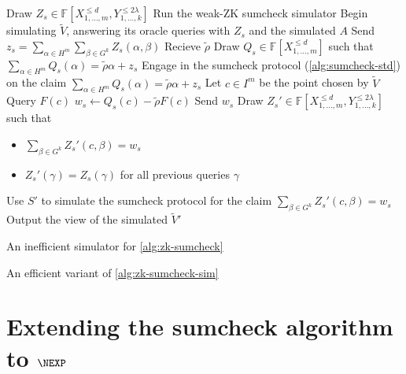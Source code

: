 \documentclass[english]{reedthesis}
\theoremstyle{plain}
\theoremstyle{definition}
\theoremstyle{remark}
\begin{document}
\begin{algorithm}[htbp]
  Draw $Z_{s} \in \mathbb{F}[X_{1, \ldots, m}^{\le d}, Y_{1, \ldots, k}^{\le 2\lambda}]$\;
  Run the weak-ZK sumcheck simulator\; %
  Begin simulating $\tilde{V}$, answering its oracle queries with $Z_{s}$ and
  the simulated $A$\;
  Send $z_{s} = \sum_{\alpha \in H^{m}}\sum_{\beta \in G^{k}}Z_{s}(\alpha, \beta)$\;
  Recieve $\tilde{\rho}$\; %
  Draw $Q_{s} \in \mathbb{F}[X_{1, \ldots, m}^{\le d}]$ such that
  $\sum_{\alpha \in H^{m}}Q_{s}(\alpha) = \tilde{\rho}\alpha + z_{s}$\;
  Engage in the sumcheck protocol (\cref{alg:sumcheck-std}) on the claim
  $\sum_{\alpha \in H^{m}}Q_{s}(\alpha) = \tilde{\rho}\alpha + z_{s}$\;
  Let $c \in I^{m}$ be the point chosen by $\tilde{V}$\;
  Query $F(c)$\;
  $w_{s} \leftarrow Q_{s}(c) - \tilde{\rho}F(c)$\;
  Send $w_{s}$\;
  Draw $Z_{s}' \in \mathbb{F}[X_{1, \ldots, m}^{\le d}, Y_{1, \ldots, k}^{\le 2\lambda}]$ such that
  \begin{itemize}
    \item $\sum_{\beta \in G^{k}}Z_{s}'(c, \beta) = w_{s}$
    \item $Z_{s}'(\gamma) = Z_{s}(\gamma)$ for all previous queries $\gamma$\;
  \end{itemize}
  Use $S'$ to simulate the sumcheck protocol for the claim
  $\sum_{\beta \in G^{k}}Z_{s}'(c, \beta) = w_{s}$\;
  Output the view of the simulated $\tilde{V}'$\;
  \caption{An inefficient simulator for
    \cref{alg:zk-sumcheck}~\cite[p.\ 15:33]{CFGS22}}\label{alg:zk-sumcheck-sim}
\end{algorithm}

\begin{algorithm}[htbp]
  \caption{An efficient variant of
    \cref{alg:zk-sumcheck-sim}~\cite[p.\ 15:34]{CFGS22}}\label{alg:zk-sumcheck-fast}
\end{algorithm}


\section{Extending the sumcheck algorithm to $\NEXP$}

\end{document}
